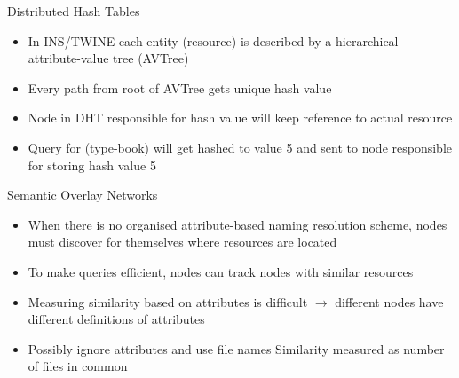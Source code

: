 \begin{note}{Distributed Hash Tables}
	\begin{itemize}
		\item In INS/TWINE each entity (resource) is described by a hierarchical attribute-value tree (AVTree)
		\item Every path from root of AVTree gets unique hash value
		\item Node in DHT responsible for hash value will keep reference to actual resource
		\item Query for (type-book) will get hashed to value 5 and sent to node responsible for storing hash value 5
	\end{itemize}
\end{note}

\begin{note}{Semantic Overlay Networks}
	\begin{itemize}
		\item When there is no organised attribute-based naming resolution scheme, nodes must discover for themselves where resources are located
		\item To make queries efficient, nodes can track nodes with similar resources
		\item Measuring similarity based on attributes is difficult $\rightarrow$ different nodes have different definitions of attributes
		\item Possibly ignore attributes and use file names
		\subitem Similarity measured as number of files in common	
	\end{itemize}
\end{note}

